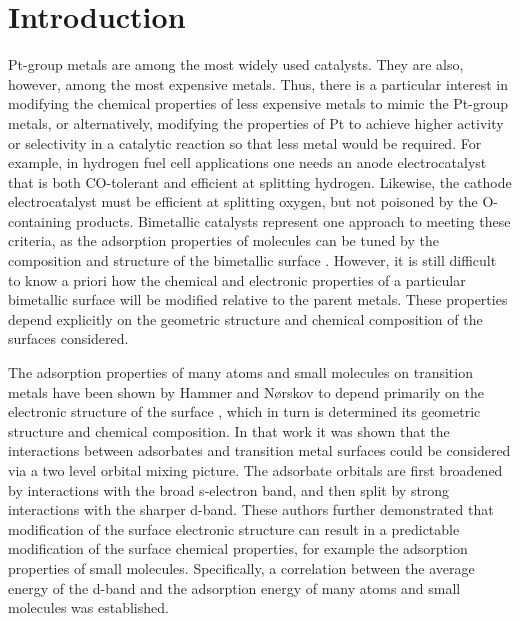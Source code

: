 \documentclass[aps,preprint,superscriptaddress,endfloats*]{revtex4}
\begin{document}
\pacs{}

\maketitle

\section{Introduction}
Pt-group metals are among the most widely used catalysts.  They are
also, however, among the most expensive metals.  Thus, there is a
particular interest in modifying the chemical properties of less
expensive metals to mimic the Pt-group metals, or alternatively,
modifying the properties of Pt to achieve higher activity or
selectivity in a catalytic reaction so that less metal would be
required.  For example, in hydrogen fuel cell applications one needs
an anode electrocatalyst that is both CO-tolerant and efficient at
splitting hydrogen. Likewise, the cathode electrocatalyst must be efficient at
splitting oxygen, but not poisoned by the O-containing products.
Bimetallic catalysts represent one approach to meeting these criteria, as
the adsorption properties of molecules can be tuned by the composition
and structure of the bimetallic surface \cite{sinfelt1983}.  However, it is
still difficult to know a priori how the chemical and electronic
properties of a particular bimetallic surface will be modified
relative to the parent metals.  These properties depend explicitly on
the geometric structure and chemical composition of the surfaces
considered.

The adsorption properties of many atoms and small molecules on
transition metals have been shown by Hammer and N{\o}rskov to depend
primarily on the electronic structure of the surface
\cite{hammer1995:_elect,hammer2000:_adv_cat}, which in turn is
determined its geometric structure and chemical composition.  In that
work it was shown that the interactions between adsorbates and
transition metal surfaces could be considered via a two level orbital
mixing picture.  The adsorbate orbitals are first broadened by
interactions with the broad s-electron band, and then split by strong
interactions with the sharper d-band.  These authors further
demonstrated that modification of the surface electronic structure can
result in a predictable modification of the surface chemical
properties, for example the adsorption properties of small molecules.
Specifically, a correlation between the average energy of the d-band
and the adsorption energy of many atoms and small molecules was
established.
\end{document}
